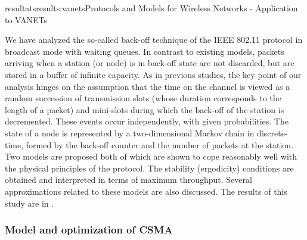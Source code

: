 \documentclass{ra2016}
\begin{document}
\begin{module}{resultats}{results:vanets}{Protocols and Models for Wireless Networks - Application to VANETs}
\begin{participants}
\end{participants}

We have analyzed the so-called back-off technique of the IEEE 802.11 protocol
in broadcast mode with waiting queues. In contrast to existing models, packets arriving when a
station (or node) is in back-off state are not discarded, but are stored in a buffer of infinite capacity.
As in previous studies, the key point of our analysis hinges on the assumption that the time on
the channel is viewed as a random succession of transmission slots (whose duration corresponds
to the length of a packet) and mini-slots during which the back-off of the station is decremented.
These events occur independently, with given probabilities. The state of a node is represented by a
two-dimensional Markov chain in discrete-time, formed by the back-off counter and the number of
packets at the station. Two models are proposed both of which are shown to cope reasonably well
with the physical principles of the protocol. The stability (ergodicity) conditions are obtained and
interpreted in terms of maximum throughput. Several approximations related to these models are
also discussed. The results of this study are in \cite{fayolle:hal-01166082}. 

\subsubsection{Model and optimization of CSMA}

\begin{participants}
\end{participants}


\end{module}
\end{document}
